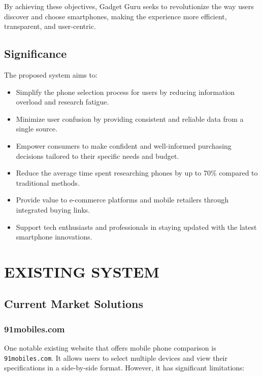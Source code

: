 \documentclass[12pt]{article}
\begin{document}
By achieving these objectives, Gadget Guru seeks to revolutionize the way users discover and choose smartphones, making the experience more efficient, transparent, and user-centric.

\subsection{Significance}
The proposed system aims to:

\begin{itemize}
    \item Simplify the phone selection process for users by reducing information overload and research fatigue.
    \item Minimize user confusion by providing consistent and reliable data from a single source.
    \item Empower consumers to make confident and well-informed purchasing decisions tailored to their specific needs and budget.
    \item Reduce the average time spent researching phones by up to 70\% compared to traditional methods.
    \item Provide value to e-commerce platforms and mobile retailers through integrated buying links.
    \item Support tech enthusiasts and professionals in staying updated with the latest smartphone innovations.
\end{itemize}

\section{EXISTING SYSTEM}

\subsection{Current Market Solutions}

\subsubsection{91mobiles.com}
One notable existing website that offers mobile phone comparison is \texttt{91mobiles.com}. It allows users to select multiple devices and view their specifications in a side-by-side format. However, it has significant limitations:
\end{document}

